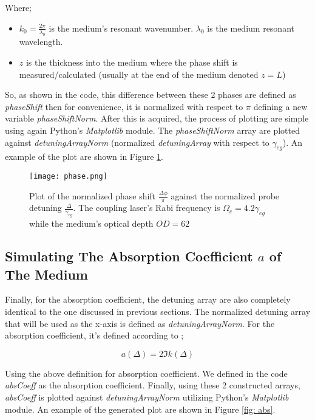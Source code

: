 Where;

\begin{itemize}
    \item $k_{0} = \frac{2\pi}{\lambda_{0}}$ is the medium's resonant wavenumber. $\lambda_{0}$ is the medium resonant wavelength.
    \item $z$ is the thickness into the medium where the phase shift is measured/calculated (usually at the end of the medium denoted $z = L$)
\end{itemize}

So, as shown in the code, this difference between these 2 phases are defined as \textit{phaseShift} then for convenience, it is normalized with respect to $\pi$ defining a new variable \textit{phaseShiftNorm}. After this is acquired, the process of plotting are simple using again Python's \textit{Matplotlib} module. The \textit{phaseShiftNorm} array are plotted against \textit{detuningArrayNorm} (normalized \textit{detuningArray} with respect to $\gamma_{eg}$). An example of the plot are shown in Figure \ref{fig: phase}.

\begin{figure}[h!]
    \centering
    \texttt{[image: phase.png]}
    \caption{Plot of the normalized phase shift $\frac{\Delta\phi}{\pi}$ against the normalized probe detuning $\frac{\Delta}{\gamma_{eg}}$. The coupling laser's Rabi frequency is $\Omega_{c} = 4.2\gamma_{eg}$ while the medium's optical depth $OD = 62$}
    \label{fig: phase}
\end{figure}

\subsection{Simulating The Absorption Coefficient $a$ of The Medium}
Finally, for the absorption coefficient, the detuning array are also completely identical to the one discussed in previous sections. The normalized detuning array that will be used as the x-axis is defined as \textit{detuningArrayNorm}. For the absorption coefficient, it's defined according to \cite{boyd2020nonlinear};

\begin{equation}
    a(\Delta) = 2 \Im{k(\Delta)}
\end{equation}

Using the above definition for absorption coefficient. We defined in the code \textit{absCoeff} as the absorption coefficient. Finally, using these 2 constructed arrays, \textit{absCoeff} is plotted against \textit{detuningArrayNorm} utilizing Python's \textit{Matplotlib} module. An example of the generated plot are shown in Figure \ref{fig: abs}.

